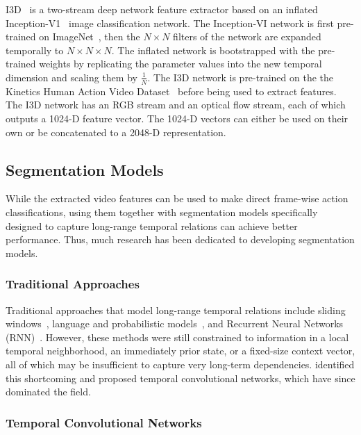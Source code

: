 I3D~\cite{carreira2017quo} is a two-stream deep network feature extractor based on an inflated Inception-V1~\cite{ioffe2015inception} image classification network. The Inception-VI network is first pre-trained on ImageNet~\cite{russakovsky2015imagenet}, then the $N \times N$ filters of the network are expanded temporally to $N \times N \times N$. The inflated network is bootstrapped with the pre-trained weights by replicating the parameter values into the new temporal dimension and scaling them by $\frac{1}{N}$. The I3D network is pre-trained on the the Kinetics Human Action Video Dataset~\cite{kay2017kinetics} before being used to extract features. The I3D network has an RGB stream and an optical flow stream, each of which outputs a 1024-D feature vector. The 1024-D vectors can either be used on their own or be concatenated to a 2048-D representation.

\subsection{Segmentation Models}

While the extracted video features can be used to make direct frame-wise action classifications, using them together with segmentation models specifically designed to capture long-range temporal relations can achieve better performance. Thus, much research has been dedicated to developing segmentation models.

\subsubsection{Traditional Approaches}

Traditional approaches that model long-range temporal relations include sliding windows~\cite{rohrbach2012slidingwindow,ni2016sliding}, language and probabilistic models~\cite{richard2016language,kuehne2016hmm}, and Recurrent Neural Networks (RNN)~\cite{richard2017weakrnn,singh2016rnndetection}. However, these methods were still constrained to information in a local temporal neighborhood, an immediately prior state, or a fixed-size context vector, all of which may be insufficient to capture very long-term dependencies. \citeauthor{lea2017tcn} identified this shortcoming and proposed temporal convolutional networks, which have since dominated the field.

\subsubsection{Temporal Convolutional Networks}

